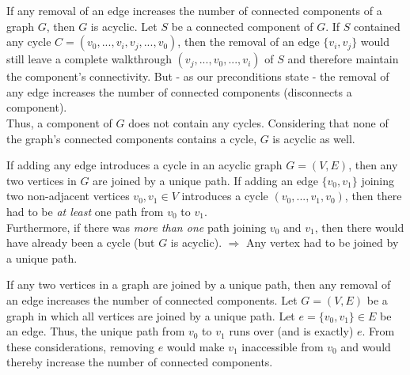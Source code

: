 \documentclass[a4paper]{article}
\begin{document}
	\begin{solution}{2}
		\begin{theorem}{If any removal of an edge increases the number of connected components of a graph $G$, then $G$ is acyclic.}
			Let $S$ be a connected component of $G$. If $S$ contained any cycle $C = (v_0, ..., v_i, v_j, ..., v_0)$, then the removal of an edge $\{v_i, v_j\}$ would still leave a complete walkthrough $(v_j, ..., v_0, ..., v_i)$ of $S$ and therefore maintain the component's connectivity.
			But - as our preconditions state - the removal of any edge increases the number of connected components (disconnects a component).\\ Thus, a component of $G$ does not contain any cycles. Considering that none of the graph's connected components contains a cycle, $G$ is acyclic as well.
		\end{theorem}
		\begin{theorem}{If adding any edge introduces a cycle in an acyclic graph $G = (V, E)$, then any two vertices in $G$ are joined by a unique path.}
			If adding an edge $\{v_0, v_1\}$ joining two non-adjacent vertices $v_0, v_1 \in V$ introduces a cycle $(v_0, ..., v_1, v_0)$, then there had to be \emph{at least} one path from $v_0$ to $v_1$.\\
			Furthermore, if there was \emph{more than one} path joining $v_0$ and $v_1$, then there would have already been a cycle (but $G$ is acyclic). $\Rightarrow$ Any vertex had to be joined by a unique path.
		\end{theorem}
		\begin{theorem}{If any two vertices in a graph are joined by a unique path, then any removal of an edge increases the number of connected components.}
			Let $G = (V, E)$ be a graph in which all vertices are joined by a unique path. Let $e = \{v_0, v_1\} \in E$ be an edge. Thus, the unique path from $v_0$ to $v_1$ runs over (and is exactly) $e$. From these considerations, removing $e$ would make $v_1$ inaccessible from $v_0$ and would thereby increase the number of connected components.
		\end{theorem}
	\end{solution} 
	\newpage
\end{document}
